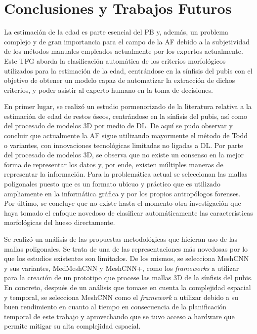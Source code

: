 \chapter{Conclusiones y Trabajos Futuros}

La estimación de la edad es parte esencial del PB y, además, un problema complejo y de gran importancia para el campo de la AF debido a la subjetividad de los métodos manuales empleados actualmente por los expertos actualmente. Este TFG aborda la clasificación automática de los criterios morfológicos utilizados para la estimación de la edad, centrándose en la sínfisis del pubis con el objetivo de obtener un modelo capaz de automatizar la extracción de dichos criterios, y poder asistir al experto humano en la toma de decisiones.

En primer lugar, se realizó un estudio pormenorizado de la literatura relativa a la estimación de edad de restos óseos, centrándose en la sínfisis del pubis, así como del procesado de modelos 3D por medio de DL. De aquí se pudo observar y concluir que actualmente la AF sigue utilizando mayormente el método de Todd \cite{RefWorks:RefID:19-todd1921age} o variantes, con innovaciones tecnológicas limitadas no ligadas a DL. Por parte del procesado de modelos 3D, se observa que no existe un consenso en la mejor forma de representar los datos y, por ende, existen múltiples maneras de representar la información. Para la problemática actual se seleccionan las mallas poligonales puesto que es un formato ubicuo y práctico que es utilizado ampliamente en la informática gráfica y por los propios antropólogos forenses. Por último, se concluye que no existe hasta el momento otra investigación que haya tomado el enfoque novedoso de clasificar automáticamente las características morfológicas del hueso directamente.

Se realizó un análisis de las propuestas metodológicas que hicieran uso de las mallas poligonales. Se trata de una de las representaciones más novedosas por lo que los estudios existentes son limitados. De los mismos, se selecciona MeshCNN y sus variantes, MedMeshCNN y MeshCNN+, como los \textit{frameworks} a utilizar para la creación de un prototipo que procese las mallas 3D de la sínfisis del pubis. En concreto, después de un análisis que tomase en cuenta la complejidad espacial y temporal, se selecciona MeshCNN como el \textit{framework} a utilizar debido a su buen rendimiento en cuanto al tiempo en consecuencia de la planificación temporal de este trabajo y aprovechando que se tuvo acceso a hardware que permite mitigar su alta complejidad espacial.

